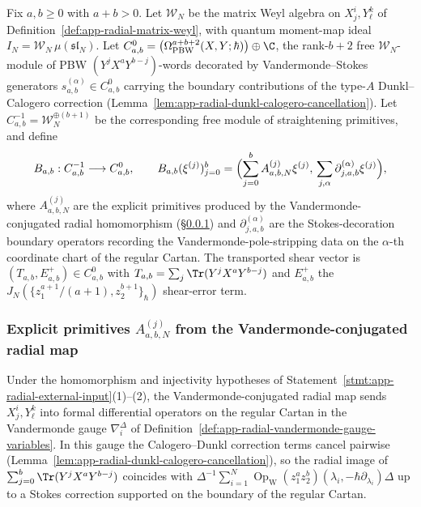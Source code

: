 \begin{defn}
\label{def:completion-pbw-stokes}
Fix \(a,b\ge 0\) with \(a+b>0\).  Let \(\mathcal W_N\) be the matrix
Weyl algebra on \(X^i_j,Y^k_\ell\) of
Definition~\ref{def:app-radial-matrix-weyl}, with quantum moment-map
ideal \(I_N=\mathcal W_N\,\mu(\mathfrak{sl}_N)\).  Let
\(C^0_{a,b}=\bigl(\Omega^{a+b+2}_{\mathrm{PBW}}(X,Y;\hbar)\bigr)
\oplus\C\), the rank-\(b+2\) free \(\mathcal W_N\)-module of PBW
\((Y^jX^aY^{b-j})\)-words decorated by Vandermonde--Stokes
generators
\(s^{(\alpha)}_{a,b}\in C^0_{a,b}\) carrying the boundary
contributions of the type-\(A\) Dunkl--Calogero
correction (Lemma~\ref{lem:app-radial-dunkl-calogero-cancellation}).
Let \(C^{-1}_{a,b}=\mathcal W_N^{\oplus(b+1)}\) be the corresponding
free module of straightening primitives, and define
\[
  B_{a,b}:C^{-1}_{a,b}\longrightarrow C^0_{a,b},
  \qquad
  B_{a,b}(\xi^{(j)})_{j=0}^b
  =\Bigl(\sum_{j=0}^bA^{(j)}_{a,b,N}\xi^{(j)},\,
   \sum_{j,\alpha}\partial^{(\alpha)}_{j,a,b}\xi^{(j)}\Bigr),
\]
where \(A^{(j)}_{a,b,N}\) are the explicit primitives produced by the
Vandermonde-conjugated radial homomorphism
(\S\ref{ssec:completion-decorated-pbw-stokes-primitives}) and
\(\partial^{(\alpha)}_{j,a,b}\) are the Stokes-decoration boundary
operators recording the
Vandermonde-pole-stripping data on the \(\alpha\)-th coordinate
chart of the regular Cartan.  The transported shear vector is
\((T_{a,b},E^+_{a,b})\in C^0_{a,b}\) with
\(T_{a,b}=\sum_j\Tr(Y^jX^aY^{b-j})\) and \(E^+_{a,b}\) the
\(J_N(\{z_1^{a+1}/(a+1),z_2^{b+1}\}_\hbar)\) shear-error term.
\end{defn}

\subsubsection{\texorpdfstring{Explicit primitives \(A^{(j)}_{a,b,N}\) from the Vandermonde-conjugated radial map}{Explicit primitives A-j-a,b,N from the Vandermonde-conjugated radial map}}
\label{ssec:completion-decorated-pbw-stokes-primitives}

Under the homomorphism and injectivity hypotheses of
Statement~\ref{stmt:app-radial-external-input}(1)--(2), the
Vandermonde-conjugated radial map sends \(X^i_j,Y^k_\ell\) into
formal differential operators on the regular Cartan in the
Vandermonde gauge \(\nabla^\Delta_i\) of
Definition~\ref{def:app-radial-vandermonde-gauge-variables}.  In this
gauge the Calogero--Dunkl correction terms cancel pairwise
(Lemma~\ref{lem:app-radial-dunkl-calogero-cancellation}), so the
radial image of \(\sum_{j=0}^b\Tr(Y^jX^aY^{b-j})\) coincides with
\(\Delta^{-1}\sum_{i=1}^N\operatorname{Op}_{\mathrm W}(z_1^az_2^b)
(\lambda_i,-\hbar\partial_{\lambda_i})\Delta\) up to a Stokes
correction supported on the boundary of the regular Cartan.

